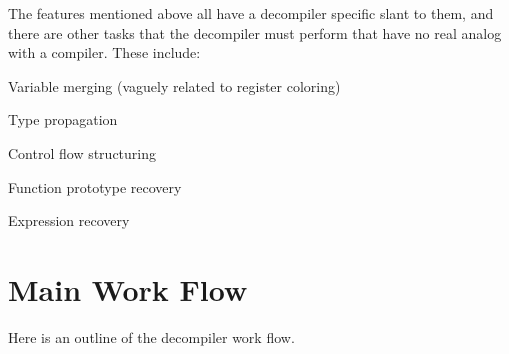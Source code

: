 The features mentioned above all have a decompiler specific slant to them, and there are other tasks that the decompiler must perform that have no real analog with a compiler. These include\+:


\begin{DoxyItemize}
\item Variable merging (vaguely related to register coloring)
\item Type propagation
\item Control flow structuring
\item Function prototype recovery
\item Expression recovery
\end{DoxyItemize}\hypertarget{index_workflow}{}\section{Main Work Flow}\label{index_workflow}
Here is an outline of the decompiler work flow.


